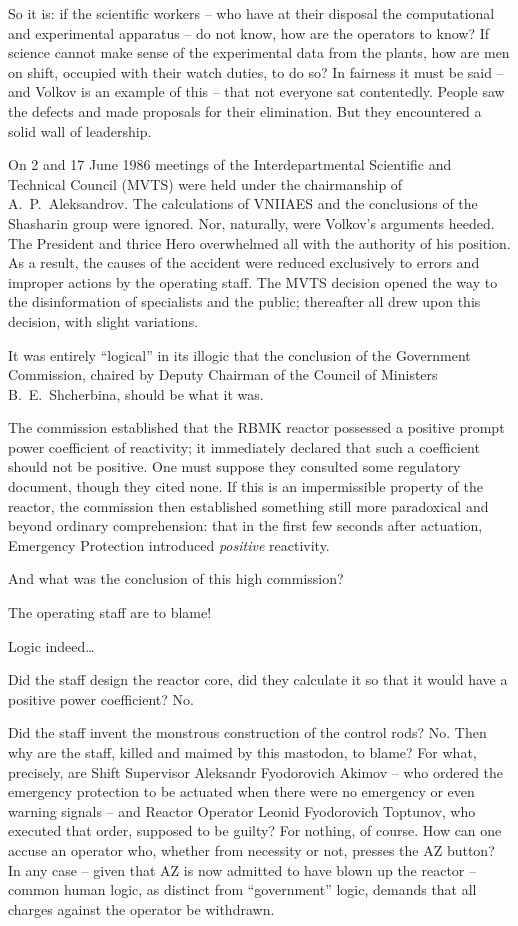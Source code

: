 \documentclass[openright]{bookest}
\begin{document}
So it is: if the scientific workers -- who have at their disposal the computational and experimental apparatus -- do not know, how are the operators to know? If science cannot make sense of the experimental data from the plants, how are men on shift, occupied with their watch duties, to do so? In fairness it must be said -- and Volkov is an example of this -- that not everyone sat contentedly. People saw the defects and made proposals for their elimination. But they encountered a solid wall of leadership.

On 2 and 17 June 1986 meetings of the Interdepartmental Scientific and Technical Council (MVTS) were held under the chairmanship of A.~P.~Aleksandrov. The calculations of VNIIAES and the conclusions of the Shasharin group were ignored. Nor, naturally, were Volkov's arguments heeded. The President and thrice Hero overwhelmed all with the authority of his position. As a result, the causes of the accident were reduced exclusively to errors and improper actions by the operating staff. The MVTS decision opened the way to the disinformation of specialists and the public; thereafter all drew upon this decision, with slight variations.

It was entirely ``logical'' in its illogic that the conclusion of the Government Commission, chaired by Deputy Chairman of the Council of Ministers B.~E.~Shcherbina, should be what it was.

The commission established that the RBMK reactor possessed a positive prompt power coefficient of reactivity; it immediately declared that such a coefficient should not be positive. One must suppose they consulted some regulatory document, though they cited none. If this is an impermissible property of the reactor, the commission then established something still more paradoxical and beyond ordinary comprehension: that in the first few seconds after actuation, Emergency Protection introduced \textit{positive} reactivity.

And what was the conclusion of this high commission?

The operating staff are to blame!

Logic indeed\ldots

Did the staff design the reactor core, did they calculate it so that it would have a positive power coefficient? No.

Did the staff invent the monstrous construction of the control rods? No. Then why are the staff, killed and maimed by this mastodon, to blame? For what, precisely, are Shift Supervisor Aleksandr Fyodorovich Akimov -- who ordered the emergency protection to be actuated when there were no emergency or even warning signals -- and Reactor Operator Leonid Fyodorovich Toptunov, who executed that order, supposed to be guilty? For nothing, of course. How can one accuse an operator who, whether from necessity or not, presses the AZ button? In any case -- given that AZ is now admitted to have blown up the reactor -- common human logic, as distinct from ``government'' logic, demands that all charges against the operator be withdrawn.
\end{document}
